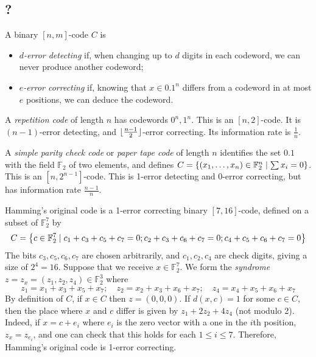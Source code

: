 \subsection{?}
\begin{definition}
    A binary \( [n,m] \)-code \( C \) is
    \begin{itemize}
        \item \emph{\( d \)-error detecting} if, when changing up to \( d \) digits in each codeword, we can never produce another codeword;
        \item \emph{\( e \)-error correcting} if, knowing that \( x \in \qty{0,1}^n \) differs from a codeword in at most \( e \) positions, we can deduce the codeword.
    \end{itemize}
\end{definition}
\begin{example}
    A \emph{repetition code} of length \( n \) has codewords \( 0^n, 1^n \).
    This is an \( [n,2] \)-code.
    It is \( (n-1) \)-error detecting, and \( \lfloor\frac{n-1}{2}\rfloor \)-error correcting.
    Its information rate is \( \frac{1}{n} \).
\end{example}
\begin{example}
    A \emph{simple parity check code} or \emph{paper tape code} of length \( n \) identifies the set \( \qty{0,1} \) with the field \( \mathbb F_2 \) of two elements, and defines \( C = \qty{(x_1, \dots, x_n) \in \mathbb F_2^n \mid \sum x_i = 0} \).
    This is an \( [n,2^{n-1}] \)-code.
    This is 1-error detecting and 0-error correcting, but has information rate \( \frac{n-1}{n} \).
\end{example}
\begin{example}
    Hamming's original code is a 1-error correcting binary \( [7,16] \)-code, defined on a subset of \( \mathbb F_2^7 \) by
    \[ C = \qty{c \in \mathbb F_2^7 \mid c_1 + c_3 + c_5 + c_7 = 0; c_2 + c_3 + c_6 + c_7 = 0; c_4 + c_5 + c_6 + c_7 = 0} \]
    The bits \( c_3, c_5, c_6, c_7 \) are chosen arbitrarily, and \( c_1, c_2, c_4 \) are check digits, giving a size of \( 2^4 = 16 \).
    Suppose that we receive \( x \in \mathbb F_2^7 \).
    We form the \emph{syndrome} \( z = z_x = (z_1, z_2, z_4) \in \mathbb F_2^3 \) where
    \[ z_1 = x_1 + x_3 + x_5 + x_7;\quad z_2 = x_2 + x_3 + x_6 + x_7;\quad z_4 = x_4 + x_5 + x_6 + x_7 \]
    By definition of \( C \), if \( x \in C \) then \( z = (0, 0, 0) \).
    If \( d(x,c) = 1 \) for some \( c \in C \), then the place where \( x \) and \( c \) differ is given by \( z_1 + 2z_2 + 4z_4 \) (not modulo 2).
    Indeed, if \( x = c + e_i \) where \( e_i \) is the zero vector with a one in the \( i \)th position, \( z_x = z_{e_i} \), and one can check that this holds for each \( 1 \leq i \leq 7 \).
    Therefore, Hamming's original code is 1-error correcting.
\end{example}
